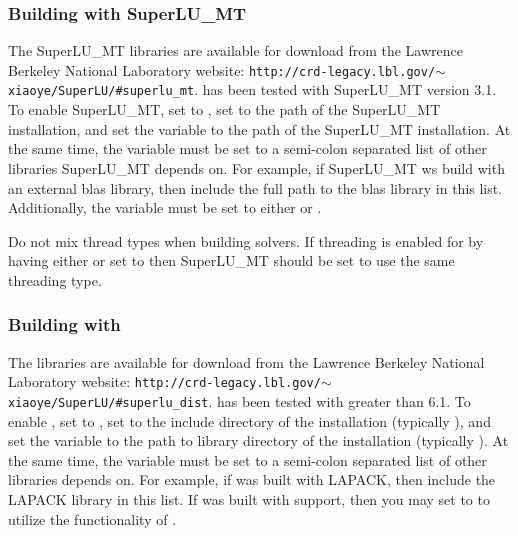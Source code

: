 \subsubsection*{Building with SuperLU\_MT}
The SuperLU\_MT libraries are available for download from the Lawrence Berkeley National Laboratory website:
{\tt http://crd-legacy.lbl.gov/$\sim$xiaoye/SuperLU/\#superlu\_mt}.
{\sundials} has been tested with SuperLU\_MT version 3.1.
To enable SuperLU\_MT, set   to , set 
to the  path of the SuperLU\_MT installation, and set the variable
\newline{} to the  path of the SuperLU\_MT installation.
At the same time, the variable  must be set to a
semi-colon separated list of other libraries SuperLU\_MT depends on. For
example, if SuperLU\_MT ws build with an external blas library, then include the
full path to the blas library in this list. Additionally, the variable
 must be set to either  or \id{{\openmp}}.

\noindent Do not mix thread types when building {\sundials} solvers.
If threading is enabled for {\sundials} by having either  or  set to 
then SuperLU\_MT should be set to use the same threading type.{\warn}

\subsubsection*{Building with {\superludist}}
The {\superludist} libraries are available for download from the Lawrence Berkeley National Laboratory website:
{\tt http://crd-legacy.lbl.gov/$\sim$xiaoye/SuperLU/\#superlu\_dist}.
{\sundials} has been tested with {\superludist} greater than 6.1.
To enable {\superludist}, set  to , set 
to the include directory of the {\superludist} installation (typically ), and set the variable
\newline{} to the path to library directory of the {\superludist} installation (typically ). At the same time, the variable
 must be set to a semi-colon separated list of
other libraries {\superludist} depends on. For example, if {\superludist} was
built with LAPACK, then include the LAPACK library in this list.
If {\superludist} was built with {\openmp} support, then you may set 
to  to utilize the {\openmp} functionality of {\superludist}.

